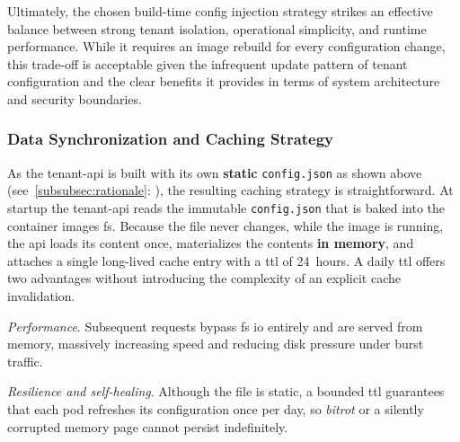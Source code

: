 \documentclass[11pt, a4paper, oneside, listof=totoc]{scrartcl}
\newcommand{\see}[1]{(see~\autoref{#1}: \textit{\nameref{#1}})}
\begin{document}
                Ultimately, the chosen build-time config injection strategy strikes an effective
                balance between strong tenant isolation, operational simplicity, and runtime
                performance.
                While it requires an image rebuild for every configuration change, this trade-off is
                acceptable given the infrequent update pattern of tenant configuration and the clear
                benefits it provides in terms of system architecture and security boundaries.
                \cleardoublepage

            \subsubsection{Data Synchronization and Caching Strategy}\label{syncAndCache}
                As the tenant-\gls{api} is built with its own \textbf{static} \texttt{config.json}
                as shown above \see{subsubsec:rationale}, the resulting caching strategy is
                straightforward.
                At startup the tenant-\gls{api} reads the immutable \texttt{config.json} that is
                baked into the container images \gls{fs}.
                Because the file never changes, while the image is running, the \gls{api} loads its
                content once, materializes the contents \textbf{in memory}, and attaches a single
                long-lived cache entry with a \gls{ttl} of 24~hours.
                A daily \gls{ttl} offers two advantages without introducing the complexity of an
                explicit cache invalidation.
                
                \begin{enumerate}[label={[\arabic*]:},
                    ref=Challenge~\arabic*,
                    leftmargin=*,
                    itemsep=0.6\baselineskip]

                    \item\label{chal:cachePerformance}
                        \textit{Performance}.
                        Subsequent requests bypass \gls{fs} \gls{io} entirely and are served from
                        memory, massively increasing speed and reducing disk pressure under burst
                        traffic.

                    \item\label{chal:cacheResilience}
                        \textit{Resilience and self-healing}.
                        Although the file is static, a bounded \gls{ttl} guarantees that each pod
                        refreshes its configuration once per day, so \textit{\gls{bitrot}} or a
                        silently corrupted memory page cannot persist indefinitely.
                        
                \end{enumerate}
\end{document}
